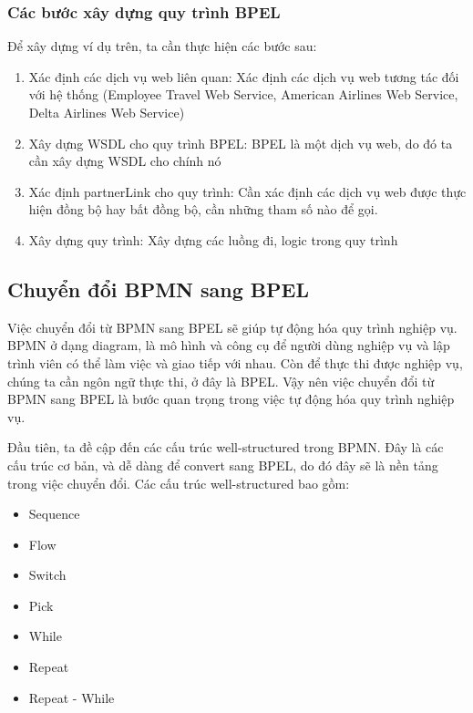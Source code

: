 \subsubsection{Các bước xây dựng quy trình BPEL}
Để xây dựng ví dụ trên, ta cần thực hiện các bước sau:
\begin{enumerate}
	\item Xác định các dịch vụ web liên quan: Xác định các dịch vụ web tương tác đối với hệ thống (Employee Travel Web Service, American Airlines Web Service, Delta Airlines Web Service)
	\item Xây dựng WSDL cho quy trình BPEL: BPEL là một dịch vụ web, do đó ta cần xây dựng WSDL cho chính nó
	\item Xác định partnerLink cho quy trình: Cần xác định các dịch vụ web được thực hiện đồng bộ hay bất đồng bộ, cần những tham số nào để gọi.
	\item Xây dựng quy trình: Xây dựng các luồng đi, logic trong quy trình
\end{enumerate} 



\subsection{Chuyển đổi BPMN sang BPEL}
\hspace*{0.5cm} \par Việc chuyển đổi từ BPMN sang BPEL sẽ giúp tự động hóa quy trình nghiệp vụ. BPMN ở dạng diagram, là mô hình và công cụ để người dùng nghiệp vụ và lập trình viên có thể làm việc và giao tiếp với nhau. 
Còn để thực thi được nghiệp vụ, chúng ta cần ngôn ngữ thực thi, ở đây là BPEL. Vậy nên việc chuyển đổi từ BPMN sang BPEL là bước quan trọng trong việc tự động hóa quy trình nghiệp vụ.

\par Đầu tiên, ta đề cập đến các cấu trúc well-structured trong BPMN. Đây là các cấu trúc cơ bản, và dễ dàng để convert sang BPEL, do đó đây sẽ là nền tảng trong việc chuyển đổi. Các cấu trúc well-structured bao gồm:
\begin{itemize}
	\item Sequence
	\item Flow
	\item Switch
	\item Pick
	\item While
	\item Repeat
	\item Repeat - While
\end{itemize}

